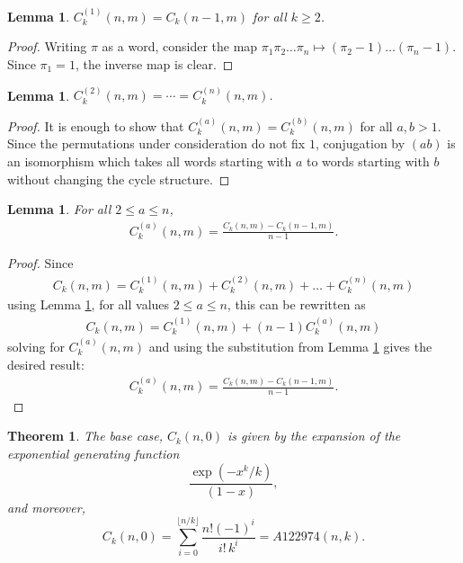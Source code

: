 \documentclass{article}
\numberwithin{equation}{subsection}
\newtheorem{lemma}[theo]{Lemma}
\newtheorem{theorem}[theo]{Theorem}
\begin{document}
\begin{lemma}
  \label{cyc1Recurrence}
  $C_k^{(1)}(n,m) = C_k(n-1, m)$ for all $k \geq 2$.
\end{lemma}
\begin{proof}
  Writing $\pi$ as a word, consider the map
  $\pi_1\pi_2\dots\pi_n \mapsto (\pi_2 - 1)\dots(\pi_n - 1)$. Since
  $\pi_1 = 1$, the inverse map is clear.
\end{proof}
\begin{lemma}
  \label{allSame}
  $C_k^{(2)}(n,m) = \cdots = C_k^{(n)}(n,m)$.
\end{lemma}
\begin{proof}
  It is enough to show that $C_k^{(a)}(n,m) = C_k^{(b)}(n,m)$ for all
  $a, b > 1$. Since the permutations under consideration do not fix $1$,
  conjugation by $(ab)$ is an isomorphism which takes all words starting
  with $a$ to words starting with $b$ without changing the cycle structure.
\end{proof}
\begin{lemma}
  \label{cycRecurrenceWithFixedBeginning}
  For all $2 \leq a \leq n$, \begin{align}
    C_k^{(a)}(n,m) = \frac{C_k(n, m) - C_k(n-1, m)}{n - 1}.
  \end{align}
\end{lemma}
\begin{proof}
  Since \begin{align}
    C_k(n, m) = C_k^{(1)}(n, m) + C_k^{(2)}(n, m) + \dots + C_k^{(n)}(n, m)
  \end{align} using Lemma \ref{allSame}, for all values $2 \leq a \leq n$,
  this can be rewritten as \begin{align}
    C_k(n, m) = C_k^{(1)}(n, m) + (n-1)C_k^{(a)}(n, m)
  \end{align} solving for $C_k^{(a)}(n, m)$ and using the substitution from Lemma
  \ref{cyc1Recurrence} gives the desired result: \begin{align}
    C_k^{(a)}(n, m) = \frac{C_k(n, m) - C_k(n-1, m)}{n - 1}.
  \end{align}
\end{proof}
\begin{theorem}
  \label{basecase}
  The base case, $C_k(n,0)$ is given by the expansion of the exponential
  generating function \begin{equation}
    \frac{\exp(-x^k/k)}{(1-x)},
  \end{equation} and moreover, \begin{equation}
    C_k(n,0)
    = \sum_{i=0}^{\lfloor n/k \rfloor} \frac{n! (-1)^i}{i!\,k^i}
    = A122974(n,k).
  \end{equation}
\end{theorem}
\end{document}
